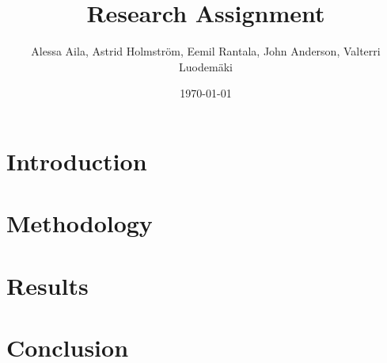 \documentclass[12pt, a4paper]{article}
\title{Research Assignment}
\author{Alessa Aila, Astrid Holmström, Eemil Rantala, John Anderson, Valterri Luodemäki}
\date{\today} %
\begin{document}
\maketitle
\tableofcontents
\newpage

\section{Introduction}
\lipsum[1-2] %

\section{Methodology}
\lipsum[3-4] %

\section{Results}
\lipsum[5-6] %

\section{Conclusion}
\lipsum[7-8] %

%  
% 
\end{document}
